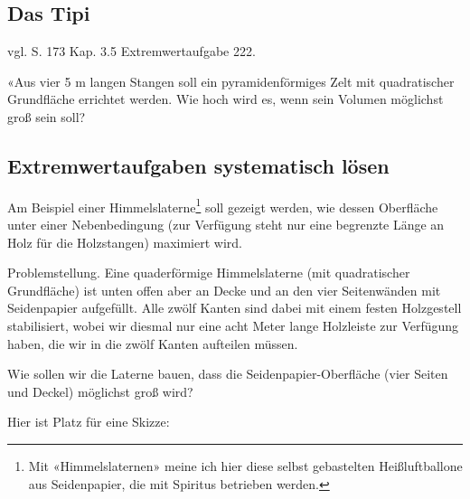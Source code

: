 \newpage
\subsection{Das Tipi}
vgl. \cite{frommenwiler18geom} S. 173 Kap. 3.5 Extremwertaufgabe 222.


«Aus vier 5 m langen Stangen soll ein pyramidenförmiges Zelt mit quadratischer Grundfläche errichtet werden.
Wie hoch wird es, wenn sein Volumen möglichst groß sein soll?

\newpage


\subsection{Extremwertaufgaben systematisch lösen}
Am Beispiel einer Himmelslaterne\footnote{Mit «Himmelslaternen» meine ich hier diese selbst gebastelten Heißluftballone aus Seidenpapier, die mit Spiritus betrieben werden.} soll gezeigt werden, wie dessen Oberfläche unter einer Nebenbedingung (zur Verfügung steht nur eine begrenzte Länge an Holz für die Holzstangen) maximiert wird.

Problemstellung. Eine quaderförmige Himmelslaterne (mit quadratischer
Grundfläche) ist unten offen aber an Decke und an den vier Seitenwänden mit Seidenpapier aufgefüllt. Alle zwölf Kanten sind dabei mit einem festen Holzgestell stabilisiert, wobei wir diesmal nur eine acht Meter lange Holzleiste zur Verfügung haben, die wir in die zwölf Kanten aufteilen müssen.

Wie sollen wir die Laterne bauen, dass die Seidenpapier-Oberfläche (vier Seiten und Deckel) möglichst groß wird?

Hier ist Platz für eine Skizze:


\newpage


